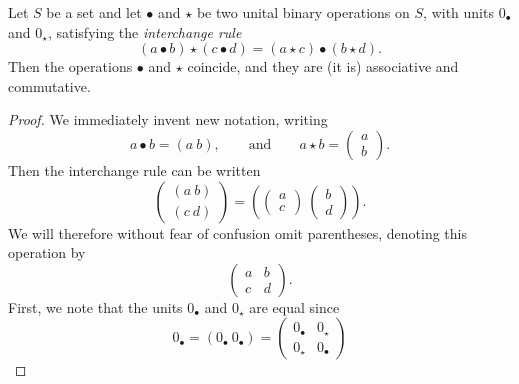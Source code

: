 \documentclass[main.tex]{subfiles}
\begin{document}
\begin{proposition}
  \label{prop:eckmann-hilton}
  Let $S$ be a set and let $\bullet$ and $\star$ be two unital binary operations on $S$, with units $0_{\bullet}$ and $0_{\star}$, satisfying the \emph{interchange rule}
  \begin{equation*}
    (a \bullet b) \star (c \bullet d) = (a \star c) \bullet (b \star d).
  \end{equation*}
  Then the operations $\bullet$ and $\star$ coincide, and they are (it is) associative and commutative.
\end{proposition}
\begin{proof}
  We immediately invent new notation, writing
  \begin{equation*}
    a \bullet b = (a\ b), \qquad \text{and}\qquad
    a \star b =
    \begin{pmatrix}
      a \\ b
    \end{pmatrix}.
  \end{equation*}
  Then the interchange rule can be written
  \begin{equation*}
    \begin{pmatrix}
      (a\ b)
      \\
      (c\ d)
    \end{pmatrix}
    =
    \left(
    \begin{pmatrix}
      a \\ c
    \end{pmatrix}
    \
    \begin{pmatrix}
      b \\ d
    \end{pmatrix}
    \right).
  \end{equation*}
  We will therefore without fear of confusion omit parentheses, denoting this operation by
  \begin{equation*}
    \begin{pmatrix}
      a & b
      \\
      c & d
    \end{pmatrix}.
  \end{equation*}
  First, we note that the units $0_{\bullet}$ and $0_{\star}$ are equal since
  \begin{equation*}
    0_{\bullet} = (0_{\bullet}\ 0_{\bullet}) =
    \begin{pmatrix}
      0_{\bullet} & 0_{\star}
      \\
      0_{\star} & 0_{\bullet}
    \end{pmatrix}

\end{equation*}
\end{proof}
\end{document}
